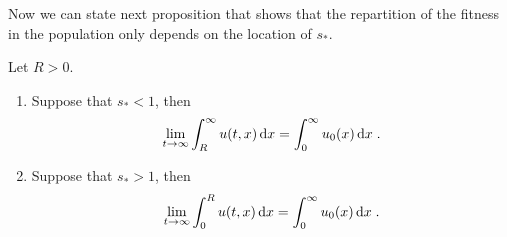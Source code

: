 \documentclass[11pt]{amsart}
\newcommand{\diff}{\,\mathrm{d}}
\begin{document}
Now we can state next proposition that shows that the repartition of the fitness in the population only depends on the location of $s_* $. 

\begin{proposition} Let $R>0$.
    \label{p:locationpop}
    \begin{enumerate}
        \item Suppose that $s_* < 1$, then
            \begin{align*}
            \lim_{t\to \infty} \int_R^\infty u(t,x) \diff x = \int_0^\infty u_0(x) \diff x
            \eqfinp
            \end{align*}
        \item Suppose that $s_* > 1$, then
            \begin{align*}
            \lim_{t\to \infty} \int_0^R u(t,x) \diff x = \int_0^\infty u_0(x) \diff x
            \eqfinp
            \end{align*}
    \end{enumerate}
\end{proposition}
\end{document}
